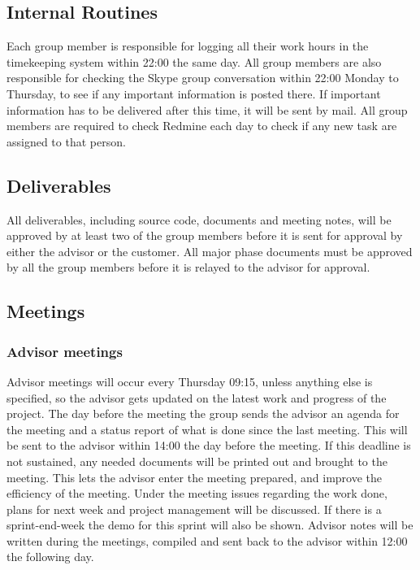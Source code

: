 \subsection{Internal Routines}
Each group member is responsible for logging all their work hours in the timekeeping system within 22:00 the same day. All group members are also responsible for checking the Skype group conversation within 22:00 Monday to Thursday, to see if any important information is posted there. If important information has to be delivered after this time, it will be sent by mail. All group members are required to check Redmine each day to check if any new task are assigned to that person.

\subsection{Deliverables}
All deliverables, including source code, documents and meeting notes, will be approved by at least two of the group members before it is sent for approval by either the advisor or the customer. All major phase documents must be approved by all the group members before it is relayed to the advisor for approval.

\subsection{Meetings}

\subsubsection{Advisor meetings}
Advisor meetings will occur every Thursday 09:15, unless anything else is specified, so the advisor gets updated on the latest work and progress of the project. The day before the meeting the group sends the advisor an agenda for the meeting and a status report of what is done since the last meeting. This will be sent to the advisor within 14:00 the day before the meeting. If this deadline is not sustained, any needed documents will be printed out and brought to the meeting. This lets the advisor enter the meeting prepared, and improve the efficiency of the meeting. Under the meeting issues regarding the work done, plans for next week and project management will be discussed. If there is a sprint-end-week the demo for this sprint will also be shown. Advisor notes will be written during the meetings, compiled and sent back to the advisor within 12:00 the following day.

